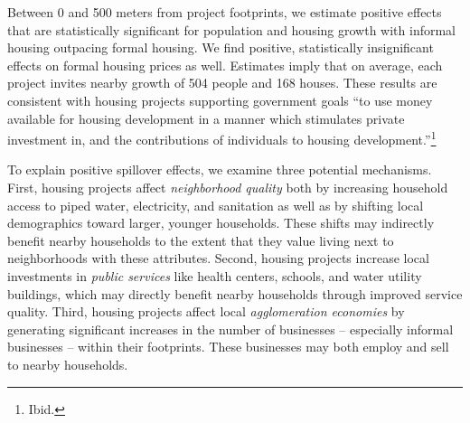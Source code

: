 \documentclass[12pt]{article}
\begin{document}







Between 0 and 500 meters from project footprints, we estimate positive effects that are statistically significant for population and housing growth with informal housing outpacing formal housing.   We find positive, statistically insignificant effects on formal housing prices as well.  Estimates imply that on average, each project invites nearby growth of 504 people and 168 houses.  These results are consistent with housing projects supporting government goals ``to use money available for housing development in a manner which stimulates private investment in, and the contributions of individuals to housing development.''\footnote{Ibid.} 

To explain positive spillover effects, we examine three potential mechanisms.  First, housing projects affect \textit{neighborhood quality} both by increasing household access to piped water, electricity, and sanitation as well as by shifting local demographics toward larger, younger households.  These shifts may indirectly benefit nearby households to the extent that they value living next to neighborhoods with these attributes.  Second, housing projects increase local investments in \textit{public services} like health centers, schools, and water utility buildings, which may directly benefit nearby households through improved service quality.  Third, housing projects affect local \textit{agglomeration economies} by generating significant increases in the number of businesses -- especially informal businesses -- within their footprints.  These businesses may both employ and sell to nearby households.
\end{document}
